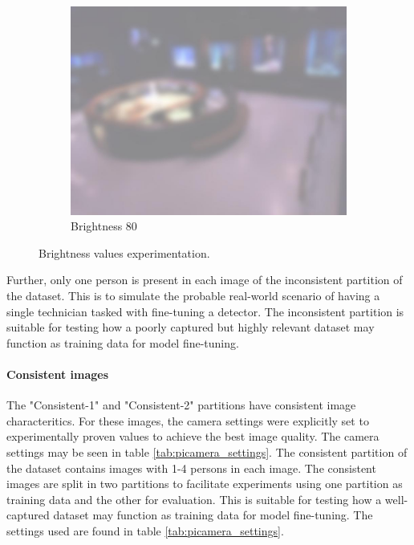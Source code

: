 \begin{figure}[H]
\begin{subfigure}{0.30\textwidth}
        \centering
        \includegraphics[width=\textwidth]{Images/DeviceImages/1st-iteration/hallvard-090224-132210-0-bright80.jpg}
        \caption{Brightness 80}
    \end{subfigure}
    \caption{Brightness values experimentation.}
    \label{fig:brightness_experimentation}
\end{figure}

Further, only one person is present in each image of the inconsistent partition of the dataset. This is to simulate the probable real-world scenario of having a single technician tasked with fine-tuning a detector. The inconsistent partition is suitable for testing how a poorly captured but highly relevant dataset may function as training data for model fine-tuning.

\paragraph{Consistent images}
The "Consistent-1" and "Consistent-2" partitions have consistent image characteritics. For these images, the camera settings were explicitly set to experimentally proven values to achieve the best image quality. The camera settings may be seen in table \ref{tab:picamera_settings}. The consistent partition of the dataset contains images with 1-4 persons in each image. The consistent images are split in two partitions to facilitate experiments using one partition as training data and the other for evaluation. This is suitable for testing how a well-captured dataset may function as training data for model fine-tuning. The settings used are found in table \ref{tab:picamera_settings}.

